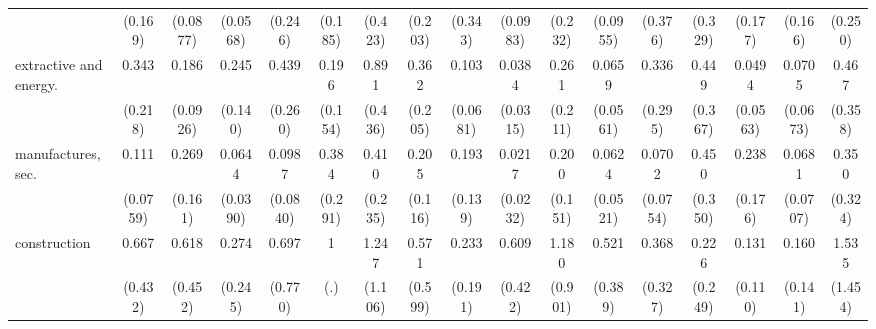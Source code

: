 {\begin{tabular}{l*{16}{c}}
                    &     (0.169)         &    (0.0877)         &    (0.0568)         &     (0.246)         &     (0.185)         &     (0.423)         &     (0.203)         &     (0.343)         &    (0.0983)         &     (0.232)         &    (0.0955)         &     (0.376)         &     (0.329)         &     (0.177)         &     (0.166)         &     (0.250)         \\
[1em]
extractive and energy.&       0.343         &       0.186\sym{***}&       0.245\sym{*}  &       0.439         &       0.196\sym{*}  &       0.891         &       0.362         &       0.103\sym{***}&      0.0384\sym{***}&       0.261         &      0.0659\sym{**} &       0.336         &       0.449         &      0.0494\sym{**} &      0.0705\sym{**} &       0.467         \\
                    &     (0.218)         &    (0.0926)         &     (0.140)         &     (0.260)         &     (0.154)         &     (0.436)         &     (0.205)         &    (0.0681)         &    (0.0315)         &     (0.211)         &    (0.0561)         &     (0.295)         &     (0.367)         &    (0.0563)         &    (0.0673)         &     (0.358)         \\
[1em]
manufactures, sec.  &       0.111\sym{**} &       0.269\sym{*}  &      0.0644\sym{***}&      0.0987\sym{**} &       0.384         &       0.410         &       0.205\sym{**} &       0.193\sym{*}  &      0.0217\sym{***}&       0.200\sym{*}  &      0.0624\sym{***}&      0.0702\sym{*}  &       0.450         &       0.238         &      0.0681\sym{**} &       0.350         \\
                    &    (0.0759)         &     (0.161)         &    (0.0390)         &    (0.0840)         &     (0.291)         &     (0.235)         &     (0.116)         &     (0.139)         &    (0.0232)         &     (0.151)         &    (0.0521)         &    (0.0754)         &     (0.350)         &     (0.176)         &    (0.0707)         &     (0.324)         \\
[1em]
construction        &       0.667         &       0.618         &       0.274         &       0.697         &           1         &       1.247         &       0.571         &       0.233         &       0.609         &       1.180         &       0.521         &       0.368         &       0.226         &       0.131\sym{*}  &       0.160\sym{*}  &       1.535         \\
                    &     (0.432)         &     (0.452)         &     (0.245)         &     (0.770)         &         (.)         &     (1.106)         &     (0.599)         &     (0.191)         &     (0.422)         &     (0.901)         &     (0.389)         &     (0.327)         &     (0.249)         &     (0.110)         &     (0.141)         &     (1.454)         \\

\end{tabular}}
